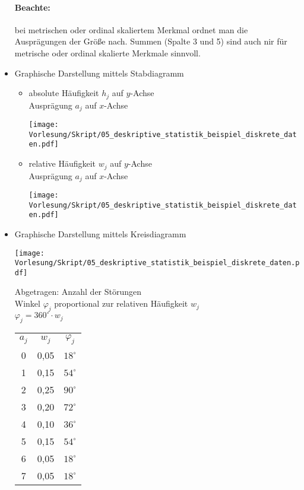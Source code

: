 \documentclass{scrreprt}
\begin{document}
\begin{itemize}
\paragraph{Beachte:} bei metrischen oder ordinal skaliertem Merkmal ordnet man die Ausprägungen der Größe nach. Summen (Spalte 3 und 5) sind auch nir für metrische oder ordinal skalierte Merkmale sinnvoll.
\item Graphische Darstellung mittels Stabdiagramm
\begin{itemize}
\item absolute Häufigkeit $h_j$ auf $y$-Achse\\
Ausprägung $a_j$ auf $x$-Achse
\begin{center}
\texttt{[image: Vorlesung/Skript/05\_deskriptive\_statistik\_beispiel\_diskrete\_daten.pdf]}
\end{center}
\item relative Häufigkeit $w_j$ auf $y$-Achse\\
Ausprägung $a_j$ auf $x$-Achse
\begin{center}
\texttt{[image: Vorlesung/Skript/05\_deskriptive\_statistik\_beispiel\_diskrete\_daten.pdf]}
\end{center}
\end{itemize}
\item Graphische Darstellung mittels Kreisdiagramm
\begin{center}
\texttt{[image: Vorlesung/Skript/05\_deskriptive\_statistik\_beispiel\_diskrete\_daten.pdf]}
\end{center}
Abgetragen: Anzahl der Störungen\\
Winkel $\varphi_j$ proportional zur relativen Häufigkeit $w_j$\\
$\varphi_j = 360^\circ \cdot w_j$\\
\begin{tabular}{c c c}
$a_j$ & $w_j$ & $\varphi_j$\\
0 & 0,05 & $18^\circ$\\
1 & 0,15 & $54^\circ$\\
2 & 0,25 & $90^\circ$\\
3 & 0,20 & $72^\circ$\\
4 & 0,10 & $36^\circ$\\
5 & 0,15 & $54^\circ$\\
6 & 0,05 & $18^\circ$\\
7 & 0,05 & $18^\circ$
\end{tabular}

\end{itemize}
\end{document}
